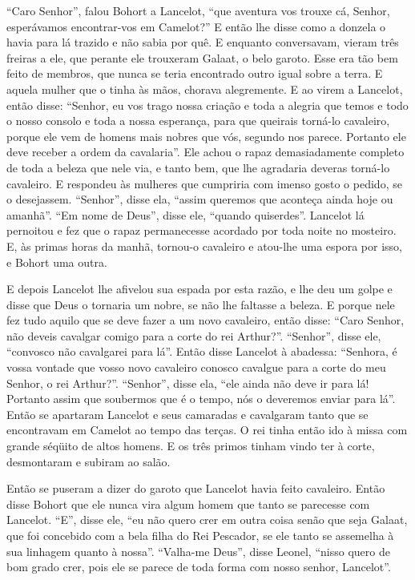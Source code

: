 “Caro Senhor”, falou Bohort a Lancelot, “que aventura vos trouxe cá, Senhor,
esperávamos encontrar-vos em Camelot?” E então lhe disse como a donzela o havia
para lá trazido e não sabia por quê. E enquanto conversavam, vieram três
freiras a ele, que perante ele trouxeram Galaat, o belo garoto. Esse era tão
bem feito de membros, que nunca se teria encontrado outro igual sobre a terra.
E aquela mulher que o tinha às mãos, chorava alegremente. E ao virem a
Lancelot, então disse: “Senhor, eu vos trago nossa criação e toda a alegria
que temos e todo o nosso consolo e toda a nossa esperança, para que queirais
torná-lo cavaleiro, porque ele vem de homens mais nobres que vós, segundo nos
parece. Portanto ele deve receber a ordem da cavalaria”. Ele achou o rapaz
demasiadamente completo de toda a beleza que nele via, e tanto bem, que lhe
agradaria deveras torná-lo cavaleiro. E respondeu às mulheres que cumpriria com
imenso gosto o pedido, se o desejassem. “Senhor”, disse ela, “assim queremos
que aconteça ainda hoje ou amanhã”. “Em nome de Deus”, disse ele, “quando
quiserdes”. Lancelot lá pernoitou e fez que o rapaz permanecesse acordado por
toda noite no mosteiro. E, às primas horas da manhã, tornou-o cavaleiro e
atou-lhe uma espora por isso, e Bohort uma outra.

E depois Lancelot lhe afivelou sua espada por esta razão, e lhe deu um golpe e
disse que Deus o tornaria um nobre, se não lhe faltasse a beleza. E porque nele
fez tudo aquilo que se deve fazer a um novo cavaleiro, então disse: “Caro
Senhor, não deveis cavalgar comigo para a corte do rei Arthur?”.
“Senhor”, disse ele, “convosco não cavalgarei para lá”. Então disse Lancelot à
abadessa: “Senhora, é vossa vontade que vosso novo cavaleiro conosco cavalgue
para a corte do meu Senhor, o rei Arthur?”. “Senhor”, disse ela, “ele ainda não
deve ir para lá! Portanto assim que soubermos que é o tempo, nós o deveremos
enviar para lá”. Então se apartaram Lancelot e seus camaradas e cavalgaram
tanto que se encontravam em Camelot ao tempo das terças. O rei tinha então ido à
missa com grande séqüito de altos homens. E os três primos tinham vindo ter à
corte, desmontaram e subiram ao salão. 

Então se puseram a dizer do garoto que Lancelot havia feito cavaleiro. Então
disse Bohort que ele nunca vira algum homem que tanto se parecesse com
Lancelot. “E”, disse ele, “eu não quero crer em outra coisa senão que seja
Galaat, que foi concebido com a bela filha do Rei Pescador, se ele tanto se
assemelha à sua linhagem quanto à nossa”. “Valha-me Deus”, disse Leonel, “nisso
quero de bom grado crer, pois ele se parece de toda forma com nosso senhor, Lancelot”.

